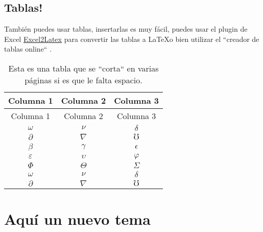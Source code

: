 		
		
	\subsection{Tablas!}
		
		\newp También puedes usar tablas, insertarlas es muy fácil, puedes usar el plugin de Excel \href{https://www.ctan.org/tex-archive/support/excel2latex/}{Excel2Latex} para convertir las tablas a \LaTeX o bien utilizar el ``creador de tablas online`` \textsuperscript{\cite{ref3}}.
		
		\begin{longtable}{ccc}
			\caption{Esta es una tabla que se ``corta`` en varias páginas si es que le falta espacio.}\label{tabl:foo}\\
			\hline
			Columna 1 & Columna 2 & Columna 3\\\hline
			\endfirsthead
			\hline
			Columna 1 & Columna 2 & Columna 3\\
			\hline
			\endhead
			\hline
			\endfoot
			\hline
			\endlastfoot
			$\omega$ & $\nu$ & $\delta$\\
			$\partial$ & $\nabla$ & $\mho$\\
			$\beta$ & $\gamma$ & $\epsilon$\\
			$\varepsilon$ & $\upsilon$ & $\varphi$\\
			$\Phi$ & $\Theta$ & $\varSigma$\\
			$\omega$ & $\nu$ & $\delta$\\
			$\partial$ & $\nabla$ & $\mho$\\
		\end{longtable}


\section{Aquí un nuevo tema}
	
